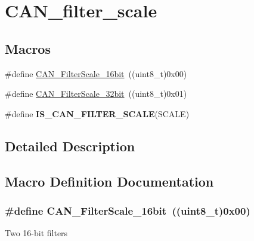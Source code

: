 \hypertarget{group___c_a_n__filter__scale}{}\section{C\+A\+N\+\_\+filter\+\_\+scale}
\label{group___c_a_n__filter__scale}
\subsection*{Macros}
\begin{DoxyCompactItemize}
\item 
\#define \hyperlink{group___c_a_n__filter__scale_ga9e0493937e73bcf9a4127eef2f255a95}{C\+A\+N\+\_\+\+Filter\+Scale\+\_\+16bit}~((uint8\+\_\+t)0x00)
\item 
\#define \hyperlink{group___c_a_n__filter__scale_gac63dfb0e11713c59268ee9f4aebab60e}{C\+A\+N\+\_\+\+Filter\+Scale\+\_\+32bit}~((uint8\+\_\+t)0x01)
\item 
\#define {\bfseries I\+S\+\_\+\+C\+A\+N\+\_\+\+F\+I\+L\+T\+E\+R\+\_\+\+S\+C\+A\+L\+E}(S\+C\+A\+L\+E)
\end{DoxyCompactItemize}


\subsection{Detailed Description}


\subsection{Macro Definition Documentation}
\hypertarget{group___c_a_n__filter__scale_ga9e0493937e73bcf9a4127eef2f255a95}{}
\subsubsection[{C\+A\+N\+\_\+\+Filter\+Scale\+\_\+16bit}]{\setlength{\rightskip}{0pt plus 5cm}\#define C\+A\+N\+\_\+\+Filter\+Scale\+\_\+16bit~((uint8\+\_\+t)0x00)}\label{group___c_a_n__filter__scale_ga9e0493937e73bcf9a4127eef2f255a95}
Two 16-\/bit filters \hypertarget{group___c_a_n__filter__scale_gac63dfb0e11713c59268ee9f4aebab60e}{}
